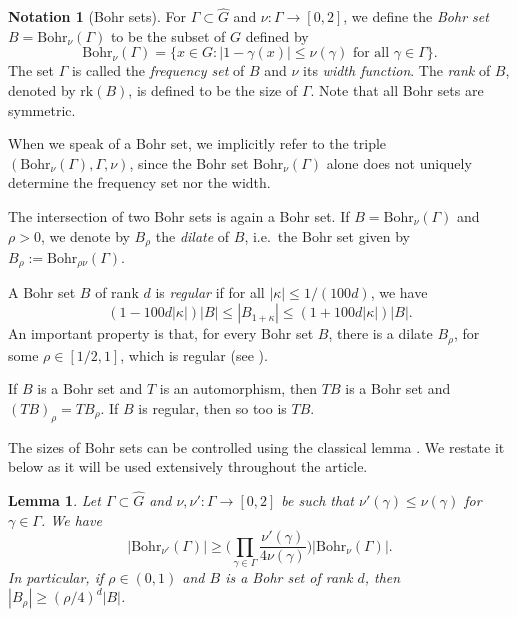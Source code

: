 \documentclass{daj}
\newtheorem{lemma}[theorem]{Lemma}
\theoremstyle{definition}
\newtheorem{notation}[theorem]{Notation}
\begin{document}
\begin{notation}[Bohr sets]
\label{not:bohr}
For $\Gamma\subset \widehat{G}$ and $\nu : \Gamma \to [0, 2]$, we define the \emph{Bohr set} $B = \mathrm{Bohr}_{\nu}(\Gamma)$ to be the subset of $G$ defined by
\begin{equation*}
\mathrm{Bohr}_{\nu}(\Gamma) = \{x\in G: |1-\gamma(x)| \leq \nu(\gamma) \text{ for all }\gamma \in \Gamma\}.
\end{equation*}
The set $\Gamma$ is called the \emph{frequency set} of $B$ and $\nu$ its \emph{width function}. The \emph{rank} of $B$, denoted by $\mathrm{rk}(B)$, is defined to be the size of $\Gamma$. Note that all Bohr sets are symmetric. 

When we speak of a Bohr set, we implicitly refer to the triple $(\mathrm{Bohr}_\nu(\Gamma), \Gamma, \nu)$, since the Bohr set $\mathrm{Bohr}_\nu(\Gamma)$ alone does not uniquely determine the frequency set nor the width.

The intersection of two Bohr sets is again a Bohr set. If $B = \mathrm{Bohr}_\nu(\Gamma)$ and $\rho > 0$, we denote by $B_{\rho}$ the \emph{dilate} of $B$, i.e.~the Bohr set given by $B_{\rho} := \mathrm{Bohr}_{\rho\nu}(\Gamma)$.

A Bohr set $B$ of rank $d$ is \emph{regular} if for all $|\kappa| \leq 1/(100d)$, we have 
\begin{equation*}
(1-100d|\kappa|) |B| \leq |B_{1+\kappa}| \leq (1+100d|\kappa|) |B|.
\end{equation*}
An important property is that, for every Bohr set $B$, there is a dilate $B_{\rho}$, for some $\rho \in [1/2, 1]$, which is regular (see \cite[Lemma~4.3]{BS}). 

If $B$ is a Bohr set and $T$ is an automorphism, then $TB$ is a Bohr set and $(TB)_{\rho} = TB_{\rho}$. If $B$ is regular, then so too is $TB$.
\end{notation}

The sizes of Bohr sets can be controlled using the classical lemma \cite[Lemma~4.4]{BS}. We restate it below as it will be used extensively throughout the article.

\begin{lemma}
\label{lem:boundbohr}
Let $\Gamma \subset \widehat{G}$ and $\nu, \nu' : \Gamma \to [0, 2]$ be such that $\nu'(\gamma) \leq \nu(\gamma)$ for $\gamma\in \Gamma$. We have 
\begin{equation*}
|\mathrm{Bohr}_{\nu'}(\Gamma)| \geq \Bigg(\prod_{\gamma\in \Gamma} \frac{\nu'(\gamma)}{4\nu(\gamma)}\Bigg) |\mathrm{Bohr}_{\nu}(\Gamma)|.
\end{equation*}
In particular, if $\rho \in (0, 1)$ and $B$ is a Bohr set of rank $d$, then $|B_{\rho}| \geq (\rho/4)^d |B|$.
\end{lemma}
\end{document}
